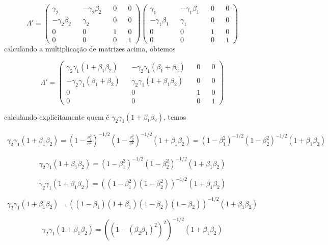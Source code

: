 \documentclass[10pt,a4paper]{article}
\begin{document}
 \begin{equation}\nonumber
 	\Lambda' = \left(\begin{matrix}
 		\gamma_2&&-\gamma_2\beta_2&&0&&0\\
 		-\gamma_2\beta_2&&\gamma_2&&0&&0\\
 		0&&0&&1&&0\\
 		0&&0&&0&&1
 	\end{matrix}\right)\left(\begin{matrix}
 		\gamma_1&&-\gamma_1\beta_1&&0&&0\\
 		-\gamma_1\beta_1&&\gamma_1&&0&&0\\
 		0&&0&&1&&0\\
 		0&&0&&0&&1
 	\end{matrix}\right)
 \end{equation}
calculando a multiplicação de matrizes acima, obtemos


\begin{equation}\nonumber
	\Lambda' = \left(\begin{matrix}
		\gamma_2\gamma_1(1+\beta_1\beta_2)&&-\gamma_2\gamma_1(\beta_1+\beta_2)&&0&&0\\
		-\gamma_2\gamma_1(\beta_1+\beta_2)&&\gamma_2\gamma_1(1+\beta_1\beta_2)&&0&&0\\
		0&&0&&1&&0\\
		0&&0&&0&&1
	\end{matrix}\right)
\end{equation}

calculando explicitamente quem é $ \gamma_2\gamma_1(1+\beta_1\beta_2) $, temos

\begin{eqnarray}
	\gamma_2\gamma_1(1+\beta_1\beta_2) = \left(1 -\frac{v_1^2}{c^2}\right)^{-1/2}\left(1 -\frac{v_2^2}{c^2}\right)^{-1/2}(1+\beta_1\beta_2) = \left(1 -\beta_1^2\right)^{-1/2}\left(1 -\beta_2^2\right)^{-1/2}(1+\beta_1\beta_2) \nonumber 
\end{eqnarray}

$$\gamma_2\gamma_1(1+\beta_1\beta_2) =\left(1 -\beta_1^2\right)^{-1/2}\left(1 -\beta_2^2\right)^{-1/2}(1+\beta_1\beta_2)$$

$$\gamma_2\gamma_1(1+\beta_1\beta_2) =\left(\left(1 -\beta_1^2\right)\left(1 -\beta_2^2\right)\right)^{-1/2}(1+\beta_1\beta_2)$$

$$\gamma_2\gamma_1(1+\beta_1\beta_2) =\left(\left(1 -\beta_1\right)\left(1 +\beta_1\right)\left(1 -\beta_2\right)\left(1 -\beta_2\right)\right)^{-1/2}(1+\beta_1\beta_2)$$

$$\gamma_2\gamma_1(1+\beta_1\beta_2) =\left((1 -(\beta_2\beta_1)^2)^2\right)^{-1/2}(1+\beta_1\beta_2)$$
\end{document}
